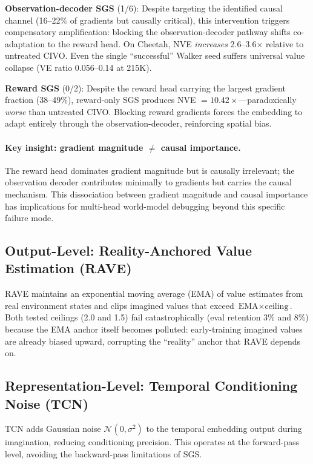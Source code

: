 \documentclass[10pt,letterpaper]{article}
\begin{document}
\textbf{Observation-decoder SGS} (1/6): Despite targeting the identified causal channel (16--22\% of gradients but causally critical), this intervention triggers compensatory amplification: blocking the observation-decoder pathway shifts co-adaptation to the reward head. On Cheetah, NVE \emph{increases} 2.6--3.6$\times$ relative to untreated CIVO.
Even the single ``successful'' Walker seed suffers universal value collapse (VE ratio 0.056--0.14 at 215K).

\textbf{Reward SGS} (0/2): Despite the reward head carrying the largest gradient fraction (38--49\%), reward-only SGS produces NVE $= 10.42\times$---paradoxically \emph{worse} than untreated CIVO. Blocking reward gradients forces the embedding to adapt entirely through the observation-decoder, reinforcing spatial bias.

\paragraph{Key insight: gradient magnitude $\neq$ causal importance.}
The reward head dominates gradient magnitude but is causally irrelevant; the observation decoder contributes minimally to gradients but carries the causal mechanism.
This dissociation between gradient magnitude and causal importance has implications for multi-head world-model debugging beyond this specific failure mode.

\subsection{Output-Level: Reality-Anchored Value Estimation (RAVE)}

RAVE maintains an exponential moving average (EMA) of value estimates from real environment states and clips imagined values that exceed $\text{EMA} \times \text{ceiling}$.
Both tested ceilings (2.0 and 1.5) fail catastrophically (eval retention 3\% and 8\%) because the EMA anchor itself becomes polluted: early-training imagined values are already biased upward, corrupting the ``reality'' anchor that RAVE depends on.

\subsection{Representation-Level: Temporal Conditioning Noise (TCN)}

TCN adds Gaussian noise $\mathcal{N}(0, \sigma^2)$ to the temporal embedding output during imagination, reducing conditioning precision.
This operates at the forward-pass level, avoiding the backward-pass limitations of SGS.
\end{document}
